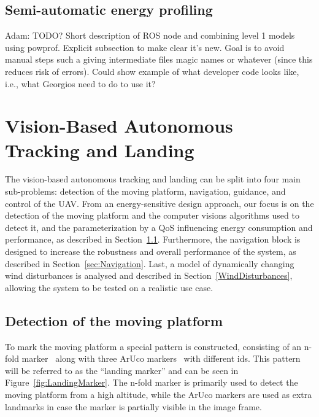 \documentclass[conference]{IEEEtran}
\begin{document}
\subsection{Semi-automatic energy profiling}

Adam: TODO? Short description of ROS node and combining level 1 models using powprof. Explicit subsection to make clear it's new. Goal is to avoid manual steps such a giving intermediate files magic names or whatever (since this reduces risk of errors). Could show example of what developer code looks like, i.e., what Georgios need to do to use it?

\section{Vision-Based Autonomous Tracking and Landing}
\label{sec:landing}

The vision-based autonomous tracking and landing can be split into four main sub-problems: detection of the moving platform, navigation, guidance, and control of the UAV. From an energy-sensitive design approach, our focus is on the detection of the moving platform and the computer visions algorithms used to detect it, and the parameterization by a QoS influencing energy consumption and performance, as described in Section~\ref{sec:Detection}. Furthermore, the navigation block is designed to increase the robustness and overall performance of the system, as described in Section~\ref{sec:Navigation}. Last, a model of dynamically changing wind disturbances is analysed and described in Section~\ref{WindDisturbances}, allowing the system to be tested on a realistic use case.


\subsection{Detection of the moving platform}
\label{sec:Detection}

To mark the moving platform a special pattern is constructed, consisting of an n-fold marker~\cite{NfoldMarker} along with three ArUco markers~\cite{ArUco_marker} with different ids. This pattern will be referred to as the ``landing marker'' and can be seen in Figure~\ref{fig:LandingMarker}. The n-fold marker is primarily used to detect the moving platform from a high altitude, while the ArUco markers are used as extra landmarks in case the marker is partially visible in the image frame. 
\end{document}
